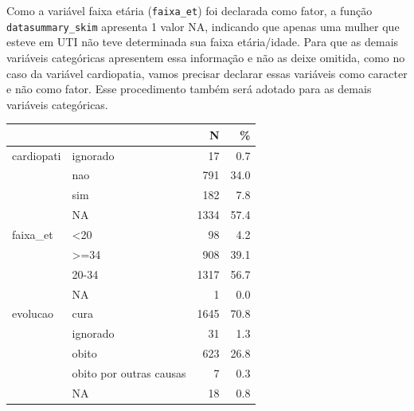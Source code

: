 \documentclass[
  letterpaper,
  DIV=11,
  numbers=noendperiod]{scrreprt}
\newenvironment{Shaded}{\begin{snugshade}}{\end{snugshade}}
\newcommand{\AttributeTok}[1]{\textcolor[rgb]{0.40,0.45,0.13}{#1}}
\newcommand{\ConstantTok}[1]{\textcolor[rgb]{0.56,0.35,0.01}{#1}}
\newcommand{\FunctionTok}[1]{\textcolor[rgb]{0.28,0.35,0.67}{#1}}
\newcommand{\NormalTok}[1]{\textcolor[rgb]{0.00,0.23,0.31}{#1}}
\newcommand{\OtherTok}[1]{\textcolor[rgb]{0.00,0.23,0.31}{#1}}
\newcommand{\SpecialCharTok}[1]{\textcolor[rgb]{0.37,0.37,0.37}{#1}}
\newcommand{\StringTok}[1]{\textcolor[rgb]{0.13,0.47,0.30}{#1}}
\begin{document}
Como a variável faixa etária (\texttt{faixa\_et}) foi declarada como
fator, a função \texttt{datasummary\_skim} apresenta 1 valor NA,
indicando que apenas uma mulher que esteve em UTI não teve determinada
sua faixa etária/idade. Para que as demais variáveis categóricas
apresentem essa informação e não as deixe omitida, como no caso da
variável cardiopatia, vamos precisar declarar essas variáveis como
caracter e não como fator. Esse procedimento também será adotado para as
demais variáveis categóricas.

\begin{Shaded}
\end{Shaded}

\begin{table}
\centering
\begin{tabular}[t]{llrr}
\toprule
  &    & N & \%\\
\midrule
cardiopati & ignorado & 17 & \num{0.7}\\
 & nao & 791 & \num{34.0}\\
 & sim & 182 & \num{7.8}\\
 & NA & 1334 & \num{57.4}\\
faixa\_et & <20 & 98 & \num{4.2}\\
 & >=34 & 908 & \num{39.1}\\
 & 20-34 & 1317 & \num{56.7}\\
 & NA & 1 & \num{0.0}\\
evolucao & cura & 1645 & \num{70.8}\\
 & ignorado & 31 & \num{1.3}\\
 & obito & 623 & \num{26.8}\\
 & obito por outras causas & 7 & \num{0.3}\\
 & NA & 18 & \num{0.8}\\
\bottomrule
\end{tabular}
\end{table}
\end{document}
